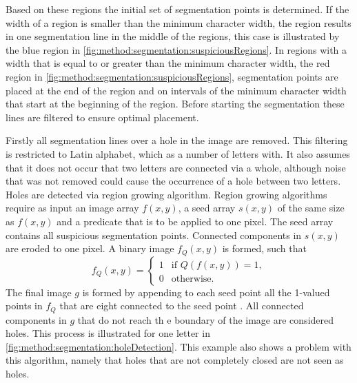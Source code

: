 	Based on these regions the initial set of segmentation points is determined. If the width of a region is smaller than the minimum character width, the region results in one segmentation line in the middle of the regions, this case is illustrated by the blue region in \cref{fig:method:segmentation:suspiciousRegions}. In regions with a width that is equal to or greater than the minimum character width, the red region in \cref{fig:method:segmentation:suspiciousRegions}, segmentation points are placed at the end of the region and on intervals of the minimum character width that start at the beginning of the region. Before starting the segmentation these lines are filtered to ensure optimal placement. 

	Firstly all segmentation lines over a hole in the image are removed. This filtering is restricted to Latin alphabet, which as a number of letters with. It also assumes that it  does not occur that two letters are connected via a whole, although noise that was not removed could cause the occurrence of a hole between two letters. Holes are detected via region growing algorithm. Region growing algorithms require as input an image array $f(x,y)$, a seed array $s(x,y)$ of the same size as $f(x,y)$ and a predicate that is to be applied to one pixel. The seed array contains all suspicious segmentation points. Connected components in $s(x,y)$ are eroded to one pixel. A binary image $f_Q(x,y)$ is formed, such that
	\begin{equation}
		f_Q(x,y) = 
		\begin{cases}
			1 & \text{if }Q(f(x,y)) = 1,\\
			0 & \text{otherwise.}
		\end{cases}
	\end{equation}
	The final image $g$ is formed by appending to each seed point all the 1-valued points in $f_Q$ that are eight connected to the seed point \cite{gonzalez2002digitalCh10}. All connected components in $g$ that do not reach th e boundary of the image are considered holes. This process is illustrated for one letter in \cref{fig:method:segmentation:holeDetection}. This example also shows a problem with this algorithm, namely that holes that are not completely closed are not seen as holes. 


